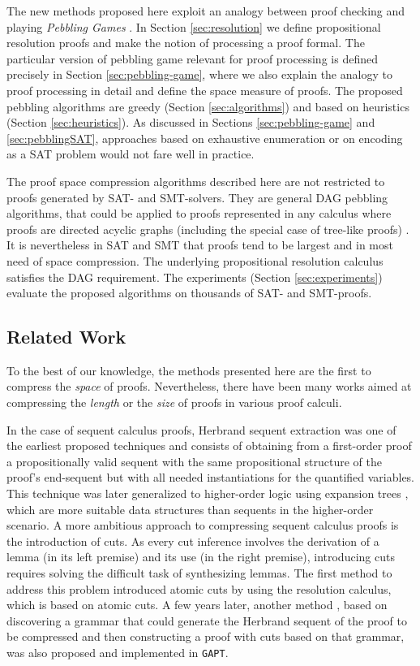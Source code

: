 The new methods proposed here exploit an analogy between proof checking and playing \emph{Pebbling Games} \cite{Kasai1979,Gilbert1980}.
In Section \ref{sec:resolution} we define propositional resolution proofs and make the notion of processing a proof formal.
The particular version of pebbling game relevant for proof processing is defined precisely in Section \ref{sec:pebbling-game}, where we also explain the analogy to proof processing in detail and define the space measure of proofs. The proposed pebbling algorithms are greedy (Section \ref{sec:algorithms}) and based on heuristics (Section \ref{sec:heuristics}). As discussed in Sections \ref{sec:pebbling-game} and \ref{sec:pebblingSAT}, approaches based on exhaustive enumeration or on encoding as a SAT problem would not fare well in practice.

The proof space compression algorithms described here are not restricted to proofs generated by SAT- and SMT-solvers. They are general DAG pebbling algorithms, that could be applied to proofs represented in any calculus where proofs are directed acyclic graphs (including the special case of tree-like proofs) \cite{APPA}. It is nevertheless in SAT and SMT that proofs tend to be largest and in most need of space compression. The underlying propositional resolution calculus satisfies the DAG requirement. The experiments (Section \ref{sec:experiments}) evaluate the proposed algorithms on thousands of SAT- and SMT-proofs.

\subsection{Related Work}

To the best of our knowledge, the methods presented here are the first to compress the \emph{space} of proofs. Nevertheless, there have been many works aimed at compressing the \emph{length} or the \emph{size} of proofs in various proof calculi. 

In the case of sequent calculus proofs, Herbrand sequent extraction \cite{HerbrandSequentExtractionMKMPaper,BrunoMScThesis,BrunoBook} was one of the earliest proposed techniques and consists of obtaining from a first-order proof a propositionally valid sequent with the same propositional structure of the proof's end-sequent but with all needed instantiations for the quantified variables. This technique was later generalized to higher-order logic \cite{MartinRienerUITPWorkshop} using expansion trees \cite{DaleMillerPhDThesisExpansionTrees}, which are more suitable data structures than sequents in the higher-order scenario. A more ambitious approach to compressing sequent calculus proofs is the introduction of cuts. As every cut inference involves the derivation of a lemma (in its left premise) and its use (in the right premise), introducing cuts requires solving the difficult task of synthesizing lemmas. The first method \cite{BrunoLPAR} to address this problem introduced atomic cuts by using the resolution calculus, which is based on atomic cuts. A few years later, another method \cite{Hetzl}, based on discovering a grammar that could generate the Herbrand sequent of the proof to be compressed and then constructing a proof with cuts based on that grammar, was also proposed and implemented in \texttt{GAPT}. 

